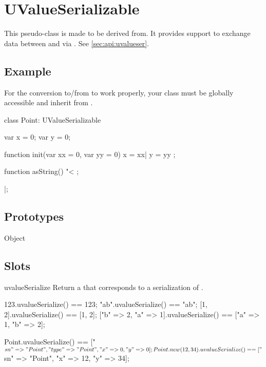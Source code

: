 
\section{UValueSerializable}

This pseudo-class is made to be derived from.  It provides support to
exchange data between \Cxx and \us via .  See
\autoref{sec:api:uvalueser}.

\subsection{Example}

For the conversion to/from \Cxx to work properly, your class must be
globally accessible and inherit from .

\begin{urbiscript}
class Point: UValueSerializable
{
  var x = 0;
  var y = 0;

  function init(var xx = 0, var yy = 0)
  {
    x = xx|
    y = yy
  };

  function asString()
  {
    "<%
  };
}|;
\end{urbiscript}

\subsection{Prototypes}

\begin{refObjects}
\item[Object]
\end{refObjects}

\subsection{Slots}

\begin{urbiscriptapi}
\item[uvalueSerialize]%
  Return a  that corresponds to a serialization of \this.
\begin{urbiassert}
                 123.uvalueSerialize() == 123;
                "ab".uvalueSerialize() == "ab";
              [1, 2].uvalueSerialize() == [1, 2];
["b" => 2, "a" => 1].uvalueSerialize() == ["a" => 1, "b" => 2];

Point.uvalueSerialize()
   == ["$sn" => "Point", "type" => "Point", "x" => 0, "y" => 0];
Point.new(12, 34).uvalueSerialize()
   == ["$sn" => "Point", "x" => 12, "y" => 34];
\end{urbiassert}

\end{urbiscriptapi}

